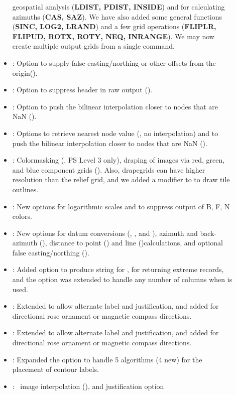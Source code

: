 \begin{description}
\begin{itemize}
geospatial analysis ({\bf LDIST,  PDIST, INSIDE}) and for calculating azimuths ({\bf CAS, SAZ}).  We have
also added some general functions ({\bf SINC, LOG2, LRAND}) and a few grid operations ({\bf FLIPLR, FLIPUD, ROTX, ROTY, NEQ,
INRANGE}).  We may now create multiple output grids from a single command.
\item {}: Option to supply false easting/northing or other offsets from the origin().
\item {}: Option to suppress header in raw output ().
\item {}:	Option to push the bilinear interpolation closer to nodes that are NaN ().
\item {}:	Options to retrieve nearest node value (, no interpolation) and to push
the bilinear interpolation closer to nodes that are NaN ().
\item {}:	Colormasking (, PS Level 3 only), draping of images via red, green,
and blue component grids ().  Also,  drapegrids can have higher resolution than the relief grid, and we
added a modifier to  to draw tile outlines.
\item {}:	New options  for logarithmic scales and  to suppress output
of B, F, N colors.
\item {}:	New options for datum conversions (, , and ), azimuth and
back-azimuth (), distance to point () and line  ()calculations, and optional false easting/northing ().
\item {}:		Added  option to produce  string for ,
 for returning extreme records, and the  option was extended to handle any number of columns when  is used.
\item {}:	Extended  to allow alternate label and justification, and added 
for directional rose ornament or magnetic compass directions.
\item {}:	Extended  to allow alternate label and justification, and added 
for directional rose ornament or magnetic compass directions.
\item {}:	Expanded the  option to handle 5 algorithms (4 new) for the placement
of contour labels. 
\item {}:	\PS\ image interpolation (), and justification option

\end{itemize}
\end{description}
